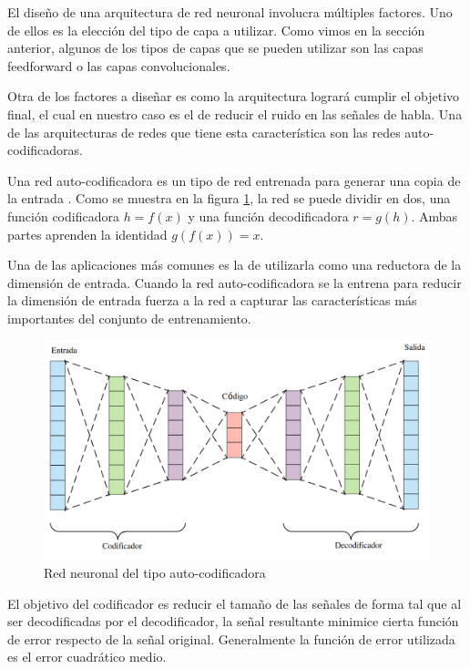 El diseño de una arquitectura de red neuronal involucra múltiples factores. Uno de ellos es la elección del tipo de capa a utilizar. Como vimos en la sección anterior, algunos de los tipos de capas que se pueden utilizar son las capas feedforward o las capas convolucionales. 

Otra de los factores a diseñar es como la arquitectura logrará cumplir el objetivo final, el cual en nuestro caso es el de reducir el ruido en las señales de habla. Una de las arquitecturas de redes que tiene esta característica son las redes auto-codificadoras.

Una red auto-codificadora es un tipo de red entrenada para generar una copia de la entrada \cite{deep_learning}. Como se muestra en la figura \ref{fig:ch3_autoencoder}, la red se puede dividir en dos, una función codificadora $h=f(x)$ y una función decodificadora $r=g(h)$. Ambas partes aprenden la identidad $g(f(x)) = x$.

Una de las aplicaciones más comunes es la de utilizarla como una reductora de la dimensión de entrada. Cuando la red auto-codificadora se la entrena para reducir la dimensión de entrada fuerza a la red a capturar las características más importantes del conjunto de entrenamiento. 

\begin{figure}
	\centering
	\centerline{\includegraphics[scale=0.2]{images/ch3/autoencoder.png}}
	\caption{Red neuronal del tipo auto-codificadora}
	\label{fig:ch3_autoencoder}
\end{figure}

El objetivo del codificador es reducir el tamaño de las señales de forma tal que al ser decodificadas por el decodificador, la señal resultante minimice cierta función de error respecto de la señal original. Generalmente la función de error utilizada es el error cuadrático medio.

